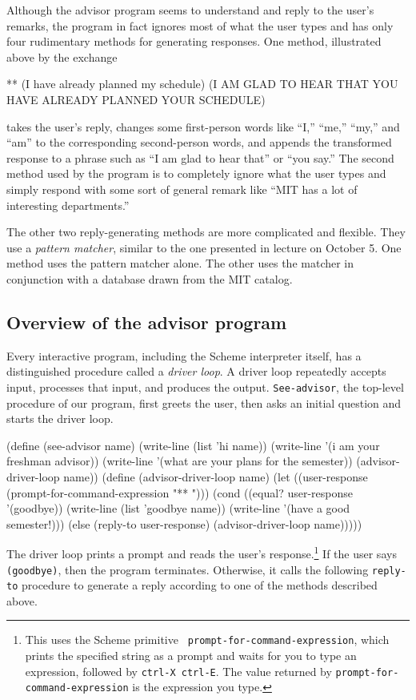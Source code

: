 Although the advisor program seems to understand and reply to the
user's remarks, the program in fact ignores most of what the user
types and has only four rudimentary methods for generating responses.
One method, illustrated above by the exchange

\beginlisp
** (I have already planned my schedule)
(I AM GLAD TO HEAR THAT YOU HAVE ALREADY PLANNED YOUR SCHEDULE)
\endlisp

\noindent
takes the user's reply, changes some first-person words like ``I,''
``me,'' ``my,'' and ``am'' to the corresponding second-person words,
and appends the transformed response to a phrase such as ``I am glad
to hear that'' or ``you say.''  The second method used by the program
is to completely ignore what the user types and simply respond with
some sort of general remark like ``MIT has a lot of interesting
departments.''

The other two reply-generating methods are more complicated and
flexible.  They use a {\em pattern matcher}, similar to the one
presented in lecture on October 5.  One method uses the pattern
matcher alone.  The other uses the matcher in conjunction with a
database drawn from the MIT catalog.

\subsection{Overview of the advisor program}

Every interactive program, including the Scheme interpreter itself,
has a distinguished procedure called a {\em driver loop}.  A driver
loop repeatedly accepts input, processes that input, and produces the
output.  {\tt See-advisor}, the top-level procedure of our program,
first greets the user, then asks an initial question and starts the
driver loop.

\beginlisp
(define (see-advisor name)
  (write-line (list 'hi name))
  (write-line '(i am your freshman advisor))
  (write-line '(what are your plans for the semester))
  (advisor-driver-loop name))
\null
(define (advisor-driver-loop name)
  (let ((user-response (prompt-for-command-expression "** ")))
    (cond ((equal? user-response '(goodbye))
           (write-line (list 'goodbye name))
           (write-line '(have a good semester!)))
          (else (reply-to user-response)
                (advisor-driver-loop name)))))
\endlisp

The driver loop prints a prompt and reads the user's
response.\footnote{This uses the Scheme primitive {\tt
prompt-for-command-expression}, which prints the specified string as a
prompt and waits for you to type an expression, followed by {\tt ctrl-X
ctrl-E}.  The value returned by {\tt prompt-for-command-expression} is
the expression you type.} If the user says {\tt (goodbye)}, then the
program terminates.  Otherwise, it calls the following {\tt reply-to}
procedure to generate a reply according to one of the methods
described above.

